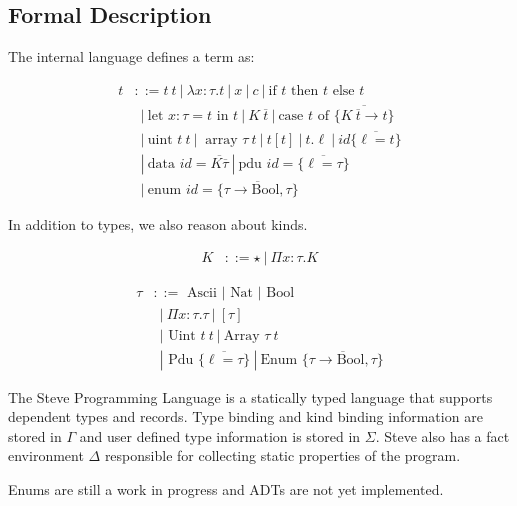 \subsection{Formal Description}
The internal language defines a term as:
  \begin{flushleft}
  \begin{align*}
  t &::= t~t ~|~ \lambda x:\tau.t ~|~ x ~|~ c ~|~
    \mbox{if } t \mbox{ then } t \mbox{ else } t \\
     &~~|~
    \mbox{let } x:\tau = t \mbox{ in } t ~|~ 
    K~\overline{t} ~|~
    \mbox{case } t \mbox{ of } \{
      \overline{K~\overline{t} \rightarrow t} \}\\
    &~~|~
    \mbox{uint } t~t ~|~ \mbox{ array } \tau~t ~|~ t[t] ~|~ t.\ell ~|~
    id \{ \overline{\ell = t} \} \\
    &~~|~
    \mbox{data } id = \overline{K \overline{\tau}} ~|~
    \mbox{pdu } id = \{ \overline{\ell = \tau} \} \\
    &~~|~ \mbox{enum } id = \{\overline{\tau \rightarrow  \mbox{Bool}, \tau}\}
  \end{align*}
\end{flushleft}
In addition to types, we also reason about kinds.
\begin{flushleft}
   \begin{align*}
      K &::= \star ~|~ \Pi x:\tau.K
   \end{align*}

  \begin{align*}
    \tau &::= \mbox{ Ascii } | \mbox{ Nat } | \mbox{ Bool } \\
         &~~|~ \Pi x:\tau.\tau ~|~ [\tau] \\
         &~~| \mbox{ Uint } t~t ~|~ \mbox{Array } \tau~t \\
         &~~| \mbox{ Pdu } \{\overline{\ell = \tau}\} ~|~ 
         \mbox{Enum } \{\overline{\tau \rightarrow  \mbox{Bool}, \tau}\} 
  \end{align*}
\end{flushleft}

The Steve Programming Language is a statically typed language that supports
dependent types and records. Type binding and kind binding information are
stored in $\Gamma$ and user defined type information is stored in $\Sigma$.
Steve also has a fact environment $\Delta$ responsible for collecting static
properties of the program.

Enums are still a work in progress and ADTs are not yet implemented.

